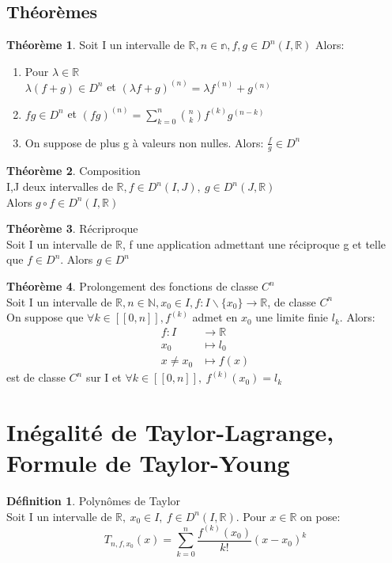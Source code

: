 \documentclass[fleqn]{article}
\theoremstyle{definition} \newtheorem*{defi}{D\'efinition}
\theoremstyle{definition} \newtheorem*{theo}{Th\'eor\`eme}
\theoremstyle{remark} \newtheorem*{rqs}{Remarques}
\theoremstyle{definition} \newtheorem*{prop}{Propri\'et\'e}
\begin{document}
\subsection{Th\'eor\`emes}
\begin{theo}
	Soit I un intervalle de $\mathbb{R}, n \in \mathbb{n}, f,g \in D^n(I, \mathbb{R})$ Alors:
	\begin{enumerate}
		\item Pour $\lambda \in \mathbb{R}$ \\
			$\lambda (f + g) \in D^n$ et $(\lambda f + g)^{(n)} = \lambda f^{(n)} + g^{(n)}$
		\item $fg \in D^n$ et $(fg)^{(n)} = \sum_{k=0}^{n} \binom{n}{k} f^{(k)} g ^{(n-k)}$
		\item On suppose de plus g \`a valeurs non nulles. Alors: $\frac{f}{g} \in D^n$
	\end{enumerate}
\end{theo}

\begin{theo} Composition\\
	I,J deux intervalles de $\mathbb{R}, f \in D^n(I, J),\ g \in D^n(J, \mathbb{R})$\\
	Alors $g \circ f \in D^n(I, \mathbb{R})$
\end{theo}

\begin{theo} R\'ecriproque\\
	Soit I un intervalle de $\mathbb{R}$, f une application admettant une r\'eciproque g et telle que $f \in D^n$. Alors $g \in D^n$
\end{theo}

\begin{theo} Prolongement des fonctions de classe $C^n$\\
	Soit I un intervalle de $\mathbb{R}, n \in \mathbb{N}, x_0 \in I, f:I\backslash\{x_0\} \rightarrow \mathbb{R}$, de classe $C^n$ \\
	On suppose que $\forall k \in [\![0,n]\!], f^{(k)}$ admet en $x_0$ une limite finie $l_k$. Alors:
	\begin{align*}
		f: I &\rightarrow \mathbb{R}\\
		x_0 &\mapsto l_0\\
		x \neq x_0 &\mapsto f(x)
	\end{align*}
	est de classe $C^n$ sur I et $\forall k \in [\![0,n]\!],\ f^{(k)}(x_0) = l_k$
\end{theo}

\section{In\'egalit\'e de Taylor-Lagrange, Formule de Taylor-Young}
\begin{defi} Polyn\^omes de Taylor \\
	Soit I un intervalle de $\mathbb{R},\ x_0 \in I,\ f \in D^n(I, \mathbb{R})$. Pour $x \in \mathbb{R}$ on pose:
	\[T_{n,f,x_0}(x) = \sum_{k=0}^{n} \frac{f^{(k)}(x_0)}{k!}(x-x_0)^k\]
\end{defi}
\end{document}
